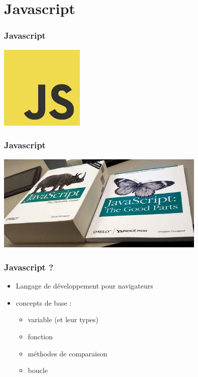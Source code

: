 \documentclass{beamer}
\begin{document}
    \section{Javascript}
    \begin{frame}
		\frametitle{Javascript}
		\centering \includegraphics[width=4cm]{images/js.jpg} 
    \end{frame}

    \begin{frame}
		\frametitle{Javascript}
		\centering \includegraphics[width=10cm]{images/complete_javascript_vs_good_parts.jpeg} 
    \end{frame}

    \begin{frame}
		\frametitle{Javascript ?}
		\begin{itemize}
			\item Langage de développement pour navigateurs
			\item concepts de base : 
				\begin{itemize}
					\item variable (et leur types)
					\item fonction
					\item méthodes de comparaison
					\item boucle
				\end{itemize}
		\end{itemize}
    \end{frame}
\end{document}
